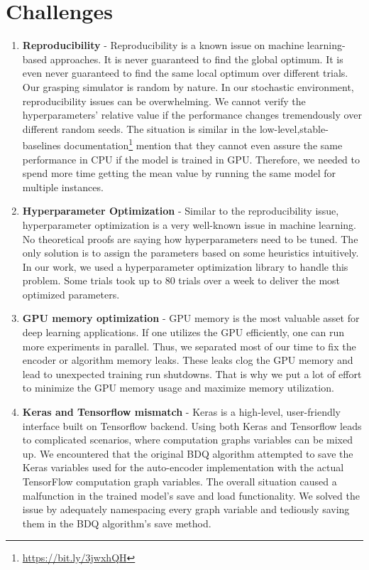 \section{Challenges}
    \begin{enumerate}
        \item \textbf{Reproducibility} -   Reproducibility is a known issue on machine learning-based approaches. It is never guaranteed to find the global optimum. It is even never guaranteed to find the same local optimum over different trials. Our grasping simulator is random by nature. In our stochastic environment, reproducibility issues can be overwhelming. We cannot verify the hyperparameters’ relative value if the performance changes tremendously over different random seeds. The situation is similar in the low-level,stable-baselines documentation\footnote{\url{https://bit.ly/3jwxhQH}} 
        mention that they cannot even assure the same performance in CPU if the model is trained in GPU. Therefore, we needed to spend more time getting the mean value by running the same model for multiple instances.
        \item \textbf{Hyperparameter Optimization} - Similar to the reproducibility issue, hyperparameter optimization is a very well-known issue in machine learning. No theoretical proofs are saying how hyperparameters need to be tuned. The only solution is to assign the parameters based on some heuristics intuitively. In our work, we used a hyperparameter optimization library to handle this problem. Some trials took up to 80 trials over a week to deliver the most optimized parameters.
        \item \textbf{GPU memory optimization} - GPU memory is the most valuable asset for deep learning applications. If one utilizes the GPU efficiently, one can run more experiments in parallel. Thus, we separated most of our time to fix the encoder or algorithm memory leaks. These leaks clog the GPU memory and lead to unexpected training run shutdowns. That is why we put a lot of effort to minimize the GPU memory usage and maximize memory utilization.
        \item \textbf{Keras and Tensorflow mismatch} - Keras is a high-level, user-friendly interface built on Tensorflow backend. Using both Keras and Tensorflow leads to complicated scenarios, where computation graphs variables can be mixed up. We encountered that the original BDQ algorithm attempted to save the Keras variables used for the auto-encoder implementation with the actual TensorFlow computation graph variables. The overall situation caused a malfunction in the trained model’s save and load functionality. We solved the issue by adequately namespacing every graph variable and tediously saving them in the BDQ algorithm’s save method.
    \end{enumerate}
  
    